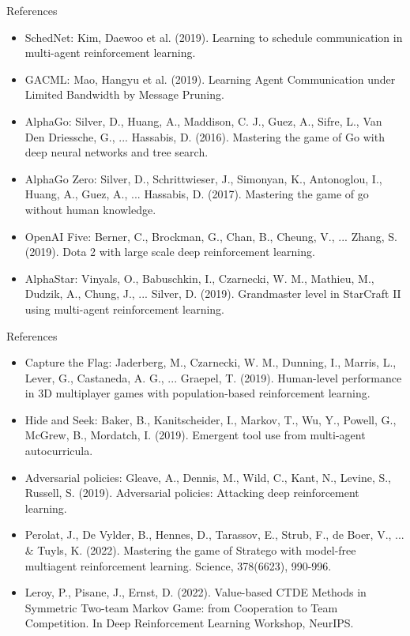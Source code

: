\documentclass[9pt, hyperref={pdfusetitle,colorlinks=true,allcolors=DarkBlue}]{beamer}
\begin{document}
\begin{frame}{References}
    \begin{itemize}
    \item SchedNet: Kim, Daewoo et al. (2019). Learning to schedule communication in multi-agent reinforcement learning.
    \item GACML: Mao, Hangyu et al. (2019). Learning Agent Communication under Limited Bandwidth by Message Pruning.
    \item AlphaGo: Silver, D., Huang, A., Maddison, C. J., Guez, A., Sifre, L., Van Den Driessche, G., ... Hassabis, D. (2016). Mastering the game of Go with deep neural networks and tree search.
    \item AlphaGo Zero: Silver, D., Schrittwieser, J., Simonyan, K., Antonoglou, I., Huang, A., Guez, A., ... Hassabis, D. (2017). Mastering the game of go without human knowledge.
    \item OpenAI Five: Berner, C., Brockman, G., Chan, B., Cheung, V., ... Zhang, S. (2019). Dota 2 with large scale deep reinforcement learning. 
    \item AlphaStar: Vinyals, O., Babuschkin, I., Czarnecki, W. M., Mathieu, M., Dudzik, A., Chung, J., ... Silver, D. (2019). Grandmaster level in StarCraft II using multi-agent reinforcement learning. 
    \end{itemize}
\end{frame}

\begin{frame}{References}
    \begin{itemize}
     
     \item Capture the Flag: Jaderberg, M., Czarnecki, W. M., Dunning, I., Marris, L., Lever, G., Castaneda, A. G., ...  Graepel, T. (2019). Human-level performance in 3D multiplayer games with population-based reinforcement learning.
     \item Hide and Seek: Baker, B., Kanitscheider, I., Markov, T., Wu, Y., Powell, G., McGrew, B., Mordatch, I. (2019). Emergent tool use from multi-agent autocurricula. 
     \item Adversarial policies: Gleave, A., Dennis, M., Wild, C., Kant, N., Levine, S.,  Russell, S. (2019). Adversarial policies: Attacking deep reinforcement learning. 
     \item Perolat, J., De Vylder, B., Hennes, D., Tarassov, E., Strub, F., de Boer, V., ... \& Tuyls, K. (2022). Mastering the game of Stratego with model-free multiagent reinforcement learning. Science, 378(6623), 990-996.
     \item Leroy, P., Pisane, J., Ernst, D. (2022). Value-based CTDE Methods in Symmetric Two-team Markov Game: from Cooperation to Team Competition. In Deep Reinforcement Learning Workshop, NeurIPS.
    \end{itemize}
\end{frame}
\end{document}
